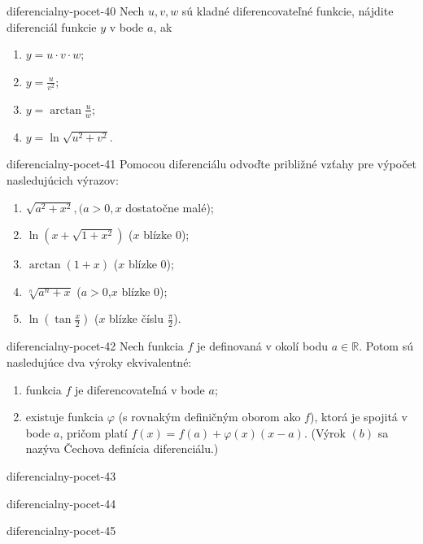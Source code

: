 \begin{defproblem}{diferencialny-pocet-40}
Nech $u,v,w$ sú kladné diferencovateľné funkcie, nájdite diferenciál funkcie $y$ v bode $a$, ak
\begin{multicols}{2}
\begin{enumerate}
    \item $y=u\cdot v\cdot w$;
    \item $y=\frac{u}{v^2}$;
    \item $y=\arctan \frac{u}{w}$;
    \item $y=\ln \sqrt{u^2+v^2}$.
\end{enumerate}
\end{multicols}
\end{defproblem}

\begin{defproblem}{diferencialny-pocet-41}
Pomocou diferenciálu odvoďte približné vzťahy pre výpočet nasledujúcich výrazov:
\begin{enumerate}
\item $\sqrt{a^2+x^2},(a>0,x$ dostatočne malé); 
\item $\ln (x+\sqrt{1+x^2})$ ($x$ blízke $0$);
\item $\arctan (1+x)$ ($x$ blízke $0$);
\item $\sqrt[n]{a^n+x}$ ($a>0$,$x$ blízke $0$);
\item$\ln (\tan \frac{x}{2})$ ($x$ blízke číslu $\frac{\pi}{2}$).
\end{enumerate}
\end{defproblem}

\begin{defproblem}{diferencialny-pocet-42}
Nech funkcia $f$ je definovaná v okolí bodu $a\in\mathbb{R}$. Potom sú nasledujúce dva výroky ekvivalentné:
\begin{enumerate}
\item funkcia $f$ je diferencovateľná v bode $a$;
\item existuje funkcia $\varphi$ (s rovnakým definičným oborom ako $f$), ktorá je spojitá v bode $a$, pričom platí $f(x)=f(a)+\varphi(x)(x-a)$.
(Výrok $(b)$ sa nazýva Čechova definícia diferenciálu.)
\end{enumerate}
\end{defproblem}

\begin{defproblem}{diferencialny-pocet-43}

\end{defproblem}

\begin{defproblem}{diferencialny-pocet-44}

\end{defproblem}

\begin{defproblem}{diferencialny-pocet-45}

\end{defproblem}
